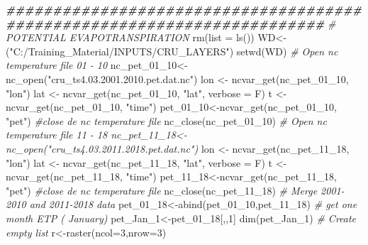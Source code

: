 \documentclass[
  10pt,
  b5paper,
]{book}
\newenvironment{Shaded}{\begin{snugshade}}{\end{snugshade}}
\newcommand{\AttributeTok}[1]{\textcolor[rgb]{0.77,0.63,0.00}{#1}}
\newcommand{\CommentTok}[1]{\textcolor[rgb]{0.56,0.35,0.01}{\textit{#1}}}
\newcommand{\DecValTok}[1]{\textcolor[rgb]{0.00,0.00,0.81}{#1}}
\newcommand{\DocumentationTok}[1]{\textcolor[rgb]{0.56,0.35,0.01}{\textbf{\textit{#1}}}}
\newcommand{\FunctionTok}[1]{\textcolor[rgb]{0.00,0.00,0.00}{#1}}
\newcommand{\NormalTok}[1]{#1}
\newcommand{\OtherTok}[1]{\textcolor[rgb]{0.56,0.35,0.01}{#1}}
\newcommand{\StringTok}[1]{\textcolor[rgb]{0.31,0.60,0.02}{#1}}
\begin{document}
\begin{Shaded}
\begin{Highlighting}[]
 \DocumentationTok{\#\#\#\#\#\#\#\#\#\#\#\#\#\#\#\#\#\#\#\#\#\#\#\#\#\#\#\#\#\#\#\#\#\#\#\#\#\#\#\#\#\#\#\#\#\#\#\#\#\#\#\#\#\#\#\#\#\#\#\#\#\#\#\#\#\#\#\#\#\#\#\#}
 \CommentTok{\# POTENTIAL EVAPOTRANSPIRATION }
 \FunctionTok{rm}\NormalTok{(}\AttributeTok{list =} \FunctionTok{ls}\NormalTok{())}
\NormalTok{WD}\OtherTok{\textless{}{-}}\NormalTok{(}\StringTok{"C:/Training\_Material/INPUTS/CRU\_LAYERS"}\NormalTok{)}
\FunctionTok{setwd}\NormalTok{(WD)}
 \CommentTok{\# Open nc temperature file 01 {-} 10}
\NormalTok{nc\_pet\_01\_10}\OtherTok{\textless{}{-}}\FunctionTok{nc\_open}\NormalTok{(}\StringTok{"cru\_ts4.03.2001.2010.pet.dat.nc"}\NormalTok{)}
\NormalTok{ lon }\OtherTok{\textless{}{-}} \FunctionTok{ncvar\_get}\NormalTok{(nc\_pet\_01\_10, }\StringTok{"lon"}\NormalTok{)}
\NormalTok{lat }\OtherTok{\textless{}{-}} \FunctionTok{ncvar\_get}\NormalTok{(nc\_pet\_01\_10, }\StringTok{"lat"}\NormalTok{, }\AttributeTok{verbose =}\NormalTok{ F)}
\NormalTok{t }\OtherTok{\textless{}{-}} \FunctionTok{ncvar\_get}\NormalTok{(nc\_pet\_01\_10, }\StringTok{"time"}\NormalTok{)}
\NormalTok{ pet\_01\_10}\OtherTok{\textless{}{-}}\FunctionTok{ncvar\_get}\NormalTok{(nc\_pet\_01\_10, }\StringTok{"pet"}\NormalTok{)}
 \CommentTok{\#close de nc temperature file}
 \FunctionTok{nc\_close}\NormalTok{(nc\_pet\_01\_10) }
 \CommentTok{\# Open nc temperature file 11 {-} 18 nc\_pet\_11\_18\textless{}{-}nc\_open("cru\_ts4.03.2011.2018.pet.dat.nc")}
\NormalTok{ lon }\OtherTok{\textless{}{-}} \FunctionTok{ncvar\_get}\NormalTok{(nc\_pet\_11\_18, }\StringTok{"lon"}\NormalTok{)}
\NormalTok{lat }\OtherTok{\textless{}{-}} \FunctionTok{ncvar\_get}\NormalTok{(nc\_pet\_11\_18, }\StringTok{"lat"}\NormalTok{, }\AttributeTok{verbose =}\NormalTok{ F)}
\NormalTok{t }\OtherTok{\textless{}{-}} \FunctionTok{ncvar\_get}\NormalTok{(nc\_pet\_11\_18, }\StringTok{"time"}\NormalTok{)}
\NormalTok{ pet\_11\_18}\OtherTok{\textless{}{-}}\FunctionTok{ncvar\_get}\NormalTok{(nc\_pet\_11\_18, }\StringTok{"pet"}\NormalTok{)}
 \CommentTok{\#close de nc temperature file}
 \FunctionTok{nc\_close}\NormalTok{(nc\_pet\_11\_18) }
 \CommentTok{\# Merge 2001{-}2010 and 2011{-}2018 data }
\NormalTok{ pet\_01\_18}\OtherTok{\textless{}{-}}\FunctionTok{abind}\NormalTok{(pet\_01\_10,pet\_11\_18)}
\CommentTok{\# get one month ETP ( January)}
\NormalTok{ pet\_Jan\_1}\OtherTok{\textless{}{-}}\NormalTok{pet\_01\_18[,,}\DecValTok{1}\NormalTok{]}
 \FunctionTok{dim}\NormalTok{(pet\_Jan\_1)}
 \CommentTok{\# Create empty list}
\NormalTok{r}\OtherTok{\textless{}{-}}\FunctionTok{raster}\NormalTok{(}\AttributeTok{ncol=}\DecValTok{3}\NormalTok{,}\AttributeTok{nrow=}\DecValTok{3}\NormalTok{)}

\end{Highlighting}
\end{Shaded}
\end{document}
